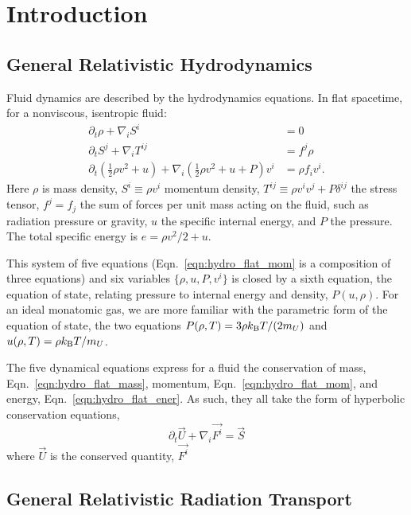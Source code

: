 \chapter{Introduction}
\label{chap:intro}



\section{General Relativistic Hydrodynamics}
\label{sec:gr_hydro}
Fluid dynamics are described by the hydrodynamics equations. In flat spacetime,
for a nonviscous, isentropic fluid:
\begin{align}
  \label{eqn:hydro_flat_mass}
  \partial_t \rho + \nabla_i S^i       &= 0 \\
  \label{eqn:hydro_flat_mom}
  \partial_t S^j +  \nabla_i T^{ij}    &= f^j \rho \\
  \label{eqn:hydro_flat_ener}
  \partial_t (\frac{1}{2}\rho v^2+u) + \nabla_i(\frac{1}{2}\rho v^2+u+P)v^i &= \rho f_i v^i.
\end{align}
Here $\rho$ is mass density,
$S^i\equiv \rho v^i$ momentum density,
$T^{ij}\equiv \rho v^i v^j + P\delta^{ij}$ the stress tensor,
$f^j=f_j$ the sum of forces per unit mass acting on the fluid,
such as radiation pressure or gravity,
$u$ the specific internal energy, and
$P$ the pressure.
The total specific energy is $e=\rho v^2/2+u$.

This system of five equations (Eqn.~\ref{eqn:hydro_flat_mom} is a composition
of three equations) and six variables $\{\rho,u,P,v^i\}$ is closed by a sixth
equation, the equation of state, relating pressure to internal energy and
density, $P(u,\rho)$.
For an ideal monatomic gas,
we are more familiar with the parametric form of the equation
of state, the two equations $P(\rho,T)=3\rho k_{\rm B} T/(2m_U)$ and
$u(\rho,T)=\rho k_{\rm B} T/m_U$.

The five dynamical equations
express for a fluid the conservation of
mass, Eqn.~\ref{eqn:hydro_flat_mass},
momentum, Eqn.~\ref{eqn:hydro_flat_mom}, and
energy, Eqn.~\ref{eqn:hydro_flat_ener}.
As such, they all take the form of hyperbolic conservation equations,
\begin{equation}
  \partial_t \vec{U} + \nabla_i \vec{F^i} = \vec{S}
\end{equation}
where $\vec{U}$ is the conserved quantity, $\vec{F^i}$

\section{General Relativistic Radiation Transport}
\label{sec:rad_transport}

